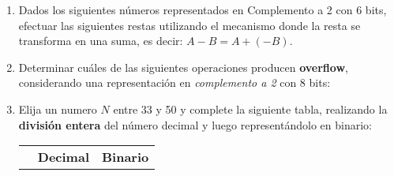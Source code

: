 \documentclass[12pt]{article}
\begin{document}
\begin{enumerate}

    \item Dados los siguientes números representados en Complemento a 2 con 6
        bits, efectuar las siguientes restas utilizando el mecanismo donde la
        resta se transforma en una suma, es decir: $A-B = A+(-B)$.


    \item Determinar cuáles de las siguientes operaciones producen \textbf{overflow},
        considerando una representación en \emph{complemento a 2} con
        8 bits:


    \item Elija un numero $N$ entre 33 y 50 y complete la siguiente tabla,
        realizando la \textbf{división entera} del número decimal y luego
        representándolo en binario:

        \begin{center}

            \begin{tabular}[t]{|c|c|c|}

            \cline{2-3}

            \multicolumn{1}{c|}{}& \textbf{Decimal} & \textbf{Binario} \\


\end{tabular}
\end{center}
\end{enumerate}
\end{document}
